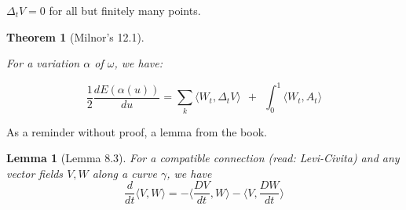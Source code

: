 \documentclass{article}
\newtheorem{thm}{Theorem}
\newtheorem*{lemm*}{Lemma}
\newcommand{\angle}[1]{\langle #1 \rangle}
\begin{document}
$\Delta_tV = 0$ for all but finitely many points.


\begin{thm}[Milnor's 12.1]
    \label{thm:12.1}

    For a variation $\alpha$ of $\omega$, we have:

    \[
        \frac{1}{2} \frac{dE(\alpha(u))}{du} =
        \sum_{k} \angle{ W_t, \Delta_tV } \ \ + \ \ \int_0^1 \angle{ W_t, A_t }
    \]

\end{thm}

As a reminder without proof, a lemma from the book.

\begin{lemm*}[Lemma 8.3]
    For a compatible connection (read: Levi-Civita) and any vector fields $V,W$ along a curve
    $\gamma$, we have
    \[
        \frac{d}{dt}\langle V, W \rangle   =
        - \langle \frac{DV}{dt}, W \rangle - \langle V, \frac{DW}{dt} \rangle
    \]
\end{lemm*}
\end{document}

